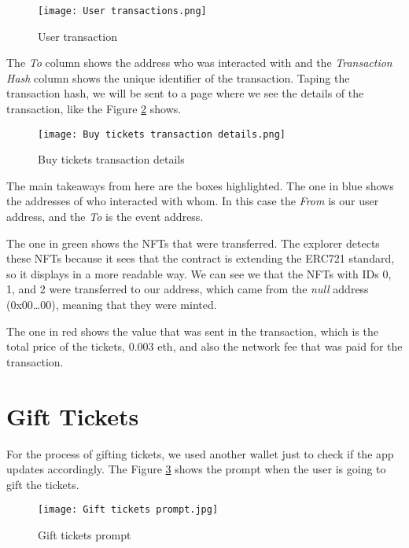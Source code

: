 \begin{figure}[H]
    \texttt{[image: User transactions.png]}
    \centering
    \caption{User transaction}
    \label{fig:user_transactions}
\end{figure}

The \textit{To} column shows the address who was interacted with and the
\textit{Transaction Hash} column shows the unique identifier of the
transaction. Taping the transaction hash, we will be sent to a page where we
see the details of the transaction, like the Figure
\ref{fig:buy_tickets_transaction_details} shows.

\begin{figure}[H]
    \texttt{[image: Buy tickets transaction details.png]}
    \centering
    \caption{Buy tickets transaction details}
    \label{fig:buy_tickets_transaction_details}
\end{figure}

The main takeaways from here are the boxes highlighted. The one in blue shows
the addresses of who interacted with whom. In this case the \textit{From} is
our user address, and the \textit{To} is the event address.

The one in green shows the NFTs that were transferred. The explorer detects
these NFTs because it sees that the contract is extending the ERC721 standard,
so it displays in a more readable way. We can see we that the NFTs with IDs 0,
1, and 2 were transferred to our address, which came from the \textit{null}
address (0x00\dots00), meaning that they were minted.

The one in red shows the value that was sent in the transaction, which is the
total price of the tickets, 0.003 eth, and also the network fee that was paid
for the transaction.

\section{Gift Tickets}
\label{sec:gift_tickets}

For the process of gifting tickets, we used another wallet just to check if the
app updates accordingly. The Figure \ref{fig:gift_tickets_prompt} shows the
prompt when the user is going to gift the tickets.

\begin{figure}[H]
    \texttt{[image: Gift tickets prompt.jpg]}
    \centering
    \caption{Gift tickets prompt}
    \label{fig:gift_tickets_prompt}
\end{figure}


